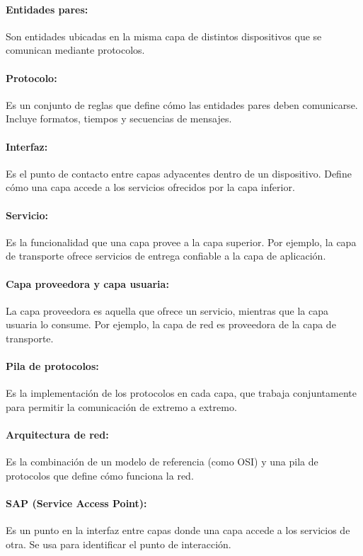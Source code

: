 \documentclass[a4paper,12pt]{article}
\begin{document}
\paragraph{Entidades pares:}
Son entidades ubicadas en la misma capa de distintos dispositivos que se comunican mediante protocolos.

\paragraph{Protocolo:}
Es un conjunto de reglas que define cómo las entidades pares deben comunicarse. Incluye formatos, tiempos y secuencias de mensajes.

\paragraph{Interfaz:}
Es el punto de contacto entre capas adyacentes dentro de un dispositivo. Define cómo una capa accede a los servicios ofrecidos por la capa inferior.

\paragraph{Servicio:}
Es la funcionalidad que una capa provee a la capa superior. Por ejemplo, la capa de transporte ofrece servicios de entrega confiable a la capa de aplicación.

\paragraph{Capa proveedora y capa usuaria:}
La capa proveedora es aquella que ofrece un servicio, mientras que la capa usuaria lo consume. Por ejemplo, la capa de red es proveedora de la capa de transporte.

\paragraph{Pila de protocolos:}
Es la implementación de los protocolos en cada capa, que trabaja conjuntamente para permitir la comunicación de extremo a extremo.

\paragraph{Arquitectura de red:}
Es la combinación de un modelo de referencia (como OSI) y una pila de protocolos que define cómo funciona la red.

\paragraph{SAP (Service Access Point):}
Es un punto en la interfaz entre capas donde una capa accede a los servicios de otra. Se usa para identificar el punto de interacción.
\end{document}
